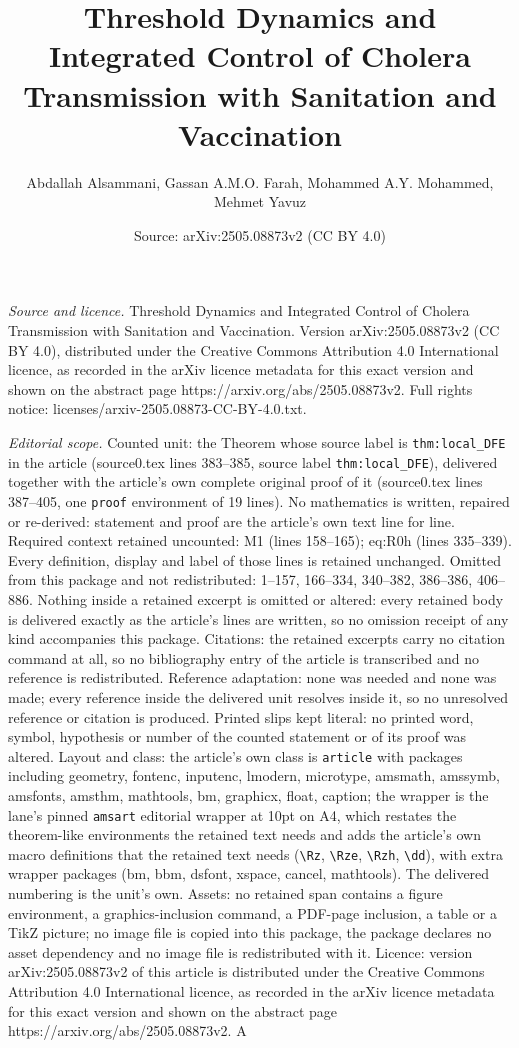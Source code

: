 \documentclass[10pt,a4paper]{amsart}
\title[Threshold Dynamics and Integrated Control of Cholera Transmi]{Threshold Dynamics and Integrated Control of Cholera Transmission with Sanitation and Vaccination}
\author{Abdallah Alsammani, Gassan A.M.O. Farah, Mohammed A.Y. Mohammed, Mehmet Yavuz}
\date{Source: arXiv:2505.08873v2 (CC BY 4.0)}
\begin{document}
\maketitle

\noindent\emph{Source and licence.} Threshold Dynamics and Integrated Control of Cholera Transmission with Sanitation and Vaccination. Version arXiv:2505.08873v2 (CC BY 4.0), distributed under the Creative Commons Attribution 4.0 International licence, as recorded in the arXiv licence metadata for this exact version and shown on the abstract page https://arxiv.org/abs/2505.08873v2. Full rights notice: licenses/arxiv-2505.08873-CC-BY-4.0.txt.\par\smallskip

\noindent\textit{Editorial scope.} Counted unit: the Theorem whose source label is \texttt{thm:local\_DFE} in the article (source0.tex lines 383--385, source label \texttt{thm:local\_DFE}), delivered together with the article's own complete original proof of it (source0.tex lines 387--405, one \texttt{proof} environment of 19 lines). No mathematics is written, repaired or re-derived: statement and proof are the article's own text line for line. Required context retained uncounted: M1 (lines 158--165); eq:R0h (lines 335--339). Every definition, display and label of those lines is retained unchanged. Omitted from this package and not redistributed: 1--157, 166--334, 340--382, 386--386, 406--886. Nothing inside a retained excerpt is omitted or altered: every retained body is delivered exactly as the article's lines are written, so no omission receipt of any kind accompanies this package. Citations: the retained excerpts carry no citation command at all, so no bibliography entry of the article is transcribed and no reference is redistributed. Reference adaptation: none was needed and none was made; every reference inside the delivered unit resolves inside it, so no unresolved reference or citation is produced. Printed slips kept literal: no printed word, symbol, hypothesis or number of the counted statement or of its proof was altered. Layout and class: the article's own class is \texttt{article} with packages including geometry, fontenc, inputenc, lmodern, microtype, amsmath, amssymb, amsfonts, amsthm, mathtools, bm, graphicx, float, caption; the wrapper is the lane's pinned \texttt{amsart} editorial wrapper at 10pt on A4, which restates the theorem-like environments the retained text needs and adds the article's own macro definitions that the retained text needs (\texttt{\textbackslash Rz}, \texttt{\textbackslash Rze}, \texttt{\textbackslash Rzh}, \texttt{\textbackslash dd}), with extra wrapper packages (bm, bbm, dsfont, xspace, cancel, mathtools). The delivered numbering is the unit's own. Assets: no retained span contains a figure environment, a graphics-inclusion command, a PDF-page inclusion, a table or a TikZ picture; no image file is copied into this package, the package declares no asset dependency and no image file is redistributed with it. Licence: version arXiv:2505.08873v2 of this article is distributed under the Creative Commons Attribution 4.0 International licence, as recorded in the arXiv licence metadata for this exact version and shown on the abstract page https://arxiv.org/abs/2505.08873v2. A 
\end{document}
